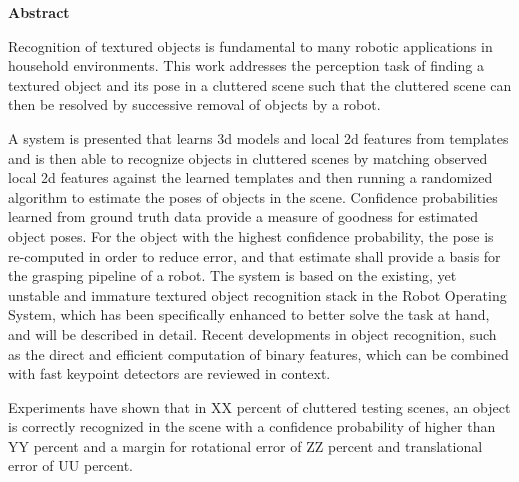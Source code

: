 

\clearemptydoublepage
{}
{}	

\vspace*{2cm}
\begin{center}
{\Large \bf Abstract}
\end{center}
\vspace{1cm}

Recognition of textured objects is fundamental to many robotic applications in
household environments. This work addresses the perception task of finding a
textured object and its pose in a cluttered scene such that the cluttered scene
can then be resolved by successive removal of objects by a robot.

A system is presented that learns 3d models and local 2d features from
templates and is then able to recognize objects in cluttered scenes by matching
observed local 2d features against the learned templates and then running a
randomized algorithm to estimate the poses of objects in the scene. Confidence
probabilities learned from ground truth data provide a measure of goodness for
estimated object poses. For the object with the highest confidence probability,
the pose is re-computed in order to reduce error, and that estimate shall
provide a basis for the grasping pipeline of a robot. The system is based on
the existing, yet unstable and immature textured object recognition stack in
the Robot Operating System, which has been specifically enhanced to better
solve the task at hand, and will be described in detail. Recent developments in
object recognition, such as the direct and efficient computation of binary
features, which can be combined with fast keypoint detectors are reviewed in
context.

Experiments have shown that in XX percent of cluttered testing scenes, an
object is correctly recognized in the scene with a confidence probability of
higher than YY percent and a margin for rotational error of ZZ percent and
translational error of UU percent.

